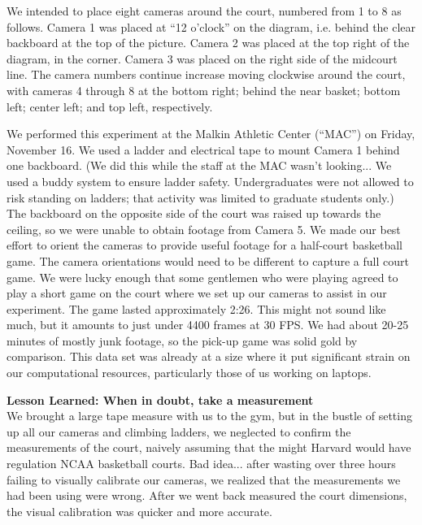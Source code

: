 \documentclass{article}
\begin{document}
We intended to place eight cameras around the court, numbered from 1 to 8 as follows.  
Camera 1 was placed at ``12 o'clock'' on the diagram, i.e. behind the clear backboard at the top of the picture.
Camera 2 was placed at the top right of the diagram, in the corner.
Camera 3 was placed on the right side of the midcourt line.
The camera numbers continue increase moving clockwise around the court, with cameras 4 through 8 at
the bottom right; behind the near basket; bottom left; center left; and top left, respectively.

We performed this experiment at the Malkin Athletic Center (``MAC'') on Friday, November 16.  
We used a ladder and electrical tape to mount Camera 1 behind one backboard.
(We did this while the staff at the MAC wasn't looking... We used a buddy system to ensure ladder safety.
Undergraduates were not allowed to risk standing on ladders; that activity was limited to graduate students only.)
The backboard on the opposite side of the court was raised up towards the ceiling,
so we were unable to obtain footage from Camera 5.
We made our best effort to orient the cameras to provide useful footage for a half-court basketball game.  
The camera orientations would need to be different to capture a full court game.
We were lucky enough that some gentlemen who were playing agreed to play
a short game on the court where we set up our cameras to assist in our experiment.
The game lasted approximately 2:26.  This might not sound like much, but it amounts to just under 4400 frames at 30 FPS.
We had about 20-25 minutes of mostly junk footage, so the pick-up game was solid gold by comparison.
This data set was already at a size where it put significant strain on our 
computational resources, particularly those of us working on laptops.

\textbf{Lesson Learned: When in doubt, take a measurement}\\
We brought a large tape measure with us to the gym, but in the bustle of setting up 
all our cameras and climbing ladders, we neglected to confirm the measurements of the court,
naively assuming that the might Harvard would have regulation NCAA basketball courts.
Bad idea... after wasting over three hours failing to visually calibrate our cameras,
we realized that the measurements we had been using were wrong.
After we went back measured the court dimensions, the visual calibration
was quicker and more accurate.

\newpage
\end{document}
